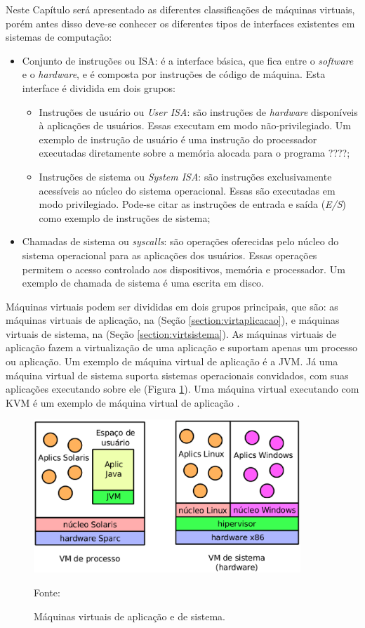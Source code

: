 Neste Capítulo será apresentado as diferentes classificações de máquinas virtuais, porém antes disso deve-se conhecer os diferentes 
tipos de interfaces existentes em sistemas de computação:
\begin{itemize}
 \item Conjunto de instruções ou \ac{ISA}: é a interface básica, que fica entre o \textit{software} e o \textit{hardware}, e é composta por 
 instruções de código de máquina. Esta interface é dividida em dois grupos:
 \begin{itemize}
  \item Instruções de usuário ou \textit{User \ac{ISA}}: são instruções de \textit{hardware} disponíveis à aplicações de usuários. Essas 
  executam em modo não-privilegiado. Um exemplo de instrução de usuário é uma instrução do processador executadas diretamente sobre a memória
  alocada para o programa ????;
  \item Instruções de sistema ou \textit{System \ac{ISA}}: são instruções exclusivamente acessíveis ao núcleo do sistema operacional. 
  Essas são executadas em modo privilegiado. Pode-se citar as instruções de entrada e saída (\textit{E/S}) como exemplo de instruções de sistema;
 \end{itemize}
 \item Chamadas de sistema ou \textit{syscalls}: são operações oferecidas pelo núcleo do sistema operacional para as aplicações dos usuários.
 Essas operações permitem o acesso controlado aos dispositivos, memória e processador. Um exemplo de chamada de sistema é uma escrita em disco.
\end{itemize}

Máquinas virtuais podem ser divididas em dois grupos principais, que são: as máquinas virtuais de aplicação, na (Seção \ref{section:virtaplicacao}), 
e máquinas virtuais de sistema, na (Seção \ref{section:virtsistema}). As máquinas virtuais de aplicação fazem a virtualização de uma 
aplicação e suportam apenas um processo ou aplicação. Um exemplo de máquina virtual de aplicação é a \ac{JVM}. Já uma máquina virtual de 
sistema suporta sistemas operacionais convidados, com suas aplicações executando sobre ele (Figura \ref{fig:vms_tipos}). Uma máquina virtual 
executando com \ac{KVM} é um exemplo de máquina virtual de aplicação \cite{laureano2008}.

\begin{figure}[vms_tipos]
 \centering
 \includegraphics[width=380px]{img/vms_tipos.eps}
 \caption{Máquinas virtuais de aplicação e de sistema.}
 \label{fig:vms_tipos}
 Fonte: \citet{laureano2008}
\end{figure}

